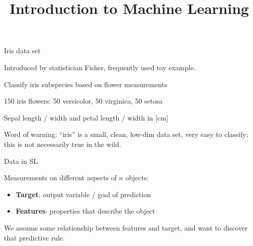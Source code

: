 \documentclass[11pt,compress,t,notes=noshow, xcolor=table]{beamer}
\title{Introduction to Machine Learning}
\begin{document}


\begin{framei}{Iris data set}
\item Introduced by statistician Fisher, frequently used toy example.
\item Classify iris subspecies based on flower measurements
\item 150 iris flowers: 50 versicolor, 50 virginica, 50 setosa
\item Sepal length / width and petal length / width in [cm]
\vfill
{}
\item Word of warning: ``iris'' is a small, clean, low-dim data set, very easy to classify; this is not necessarily true in the wild. 
\end{framei}


\begin{framei}{Data in SL}
\item Measurements on different aspects of $n$ objects:
\begin{itemize}
\item \textbf{Target}: output variable / goal of prediction
\item \textbf{Features}: properties that describe the object
\end{itemize}
\item We assume some relationship between features and target, and want to discover that predictive rule.
\vfill
{}
\end{framei}
\end{document}
